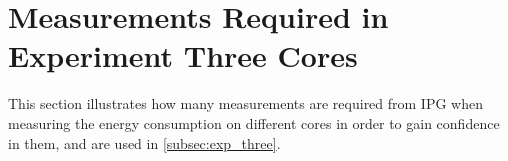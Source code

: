 \section{Measurements Required in Experiment Three Cores}\label{app:exp_three_coch}

This section illustrates how many measurements are required from IPG when measuring the energy consumption on different cores in order to gain confidence in them, and are used in \cref{subsec:exp_three}.


